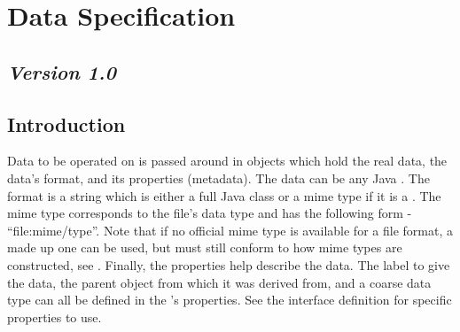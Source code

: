 \section{Data Specification}
\subsection*{\textit{Version 1.0}}
\subsection{Introduction}

Data to be operated on is passed around in  objects which hold the
real data, the data's format, and its properties (metadata). The data can be any
Java . The format is a string which is either a full Java class or
a mime type if it is a . The mime type corresponds to the
file's data type and has the following form - ``file:mime/type''. Note that if no
official mime type is available for a file format, a made up one can be used, but
must still conform to how mime types are constructed, see . Finally, the properties help describe the data. The
label to give the data, the parent  object from which it was derived
from, and a coarse data type can all be defined in the 's properties.
See the  interface definition for specific properties to use.

